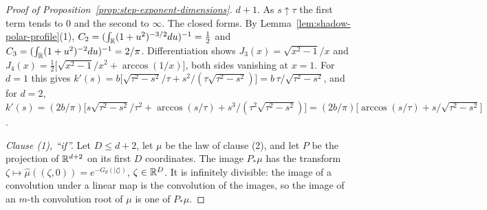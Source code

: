 \begin{proof}[Proof of Proposition~\ref{prop:step-exponent-dimensions}]
$d + 1$. As $s \uparrow \tau$ the first term tends to $0$ and the second to $\infty$. The closed
forms. By Lemma~\ref{lem:shadow-polar-profile}(1), $C_2 = (\int_{\mathbb{R}}(1+u^2)^{-3/2}du)^{-1} = \tfrac12$
and $C_3 = (\int_{\mathbb{R}}(1+u^2)^{-2}du)^{-1} = 2/\pi$. Differentiation shows
$J_3(x) = \sqrt{x^2-1}/x$ and $J_4(x) = \tfrac12\bigl[\sqrt{x^2-1}/x^2 + \arccos(1/x)\bigr]$,
both sides vanishing at $x = 1$. For $d = 1$ this gives
$k'(s) = b\bigl[\sqrt{\tau^2-s^2}/\tau + s^2/(\tau\sqrt{\tau^2-s^2})\bigr]
= b\,\tau/\sqrt{\tau^2-s^2}$, and for $d = 2$,
$k'(s) = (2b/\pi)\bigl[s\sqrt{\tau^2-s^2}/\tau^2 + \arccos(s/\tau)
+ s^3/(\tau^2\sqrt{\tau^2-s^2})\bigr] = (2b/\pi)\bigl[\arccos(s/\tau) + s/\sqrt{\tau^2-s^2}\bigr]$.

\emph{Clause (1), ``if''.} Let $D \le d + 2$, let $\mu$ be the law of clause (2), and let $P$ be
the projection of $\mathbb{R}^{d+2}$ on its first $D$ coordinates. The image $P_*\mu$ has the transform
$\zeta \mapsto \widehat\mu((\zeta,0)) = e^{-G_d(|\zeta|)}$, $\zeta \in \mathbb{R}^D$. It is infinitely
divisible: the image of a convolution under a linear map is the convolution of the images, so
the image of an $m$-th convolution root of $\mu$ is one of $P_*\mu$.


\end{proof}
